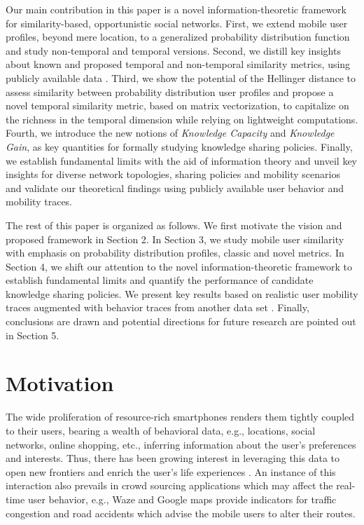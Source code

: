 \documentclass[conference]{IEEEtran}
\theoremstyle{definition}
\begin{document}
Our main contribution in this paper is a novel information-theoretic
framework for similarity-based, opportunistic social networks. First, 
we extend mobile user profiles, beyond mere location, to a generalized probability
distribution function and study non-temporal and temporal versions. Second,
we distill key insights about known and proposed temporal and non-temporal
similarity metrics, using publicly available data \cite{data}.
Third, we show the potential of the Hellinger distance to assess 
similarity between probability distribution user profiles and propose 
a novel temporal similarity metric, based on matrix vectorization, to 
capitalize on the richness in the temporal dimension while relying on lightweight 
computations. 
Fourth, we introduce the new notions of {\it Knowledge Capacity} and 
{\it Knowledge Gain}, as key quantities for formally studying knowledge sharing 
policies. Finally, we establish fundamental limits with the aid of information theory
and unveil key insights for diverse network topologies, sharing policies and mobility 
scenarios and validate our theoretical findings using publicly available user behavior 
and mobility traces.

The rest of this paper is organized as follows. We first motivate the 
vision and proposed framework in Section 2. In Section 3, we study 
mobile user similarity with emphasis on probability distribution 
profiles, classic and novel metrics. In Section 4, we 
shift our attention to the novel information-theoretic framework to establish 
fundamental limits and quantify the performance of candidate knowledge sharing 
policies.
We present key results based on realistic user mobility traces \cite{infocom,diot} 
augmented with behavior traces from another data set \cite{data}. Finally, conclusions are drawn and potential directions for future research are pointed out 
in Section 5.
\vspace{-0.5 cm}
\section{Motivation}
\vspace{-0.5 cm}
The wide proliferation of resource-rich smartphones renders them tightly coupled to their users, bearing a wealth of behavioral data, e.g., locations, social networks, online shopping, etc., inferring information about the user's preferences and interests. Thus, there has been growing interest in leveraging this data to open new frontiers and enrich the user's life experiences \cite{Eagle}. An instance of this interaction also prevails in crowd sourcing applications which may affect the real-time user behavior, e.g., Waze and Google maps provide indicators for traffic congestion and road accidents which advise the mobile users to alter their routes.
\end{document}
